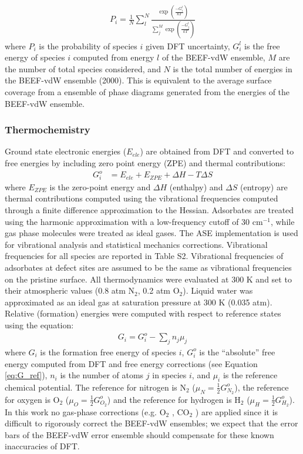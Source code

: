 \documentclass[journal=ascecg,manuscript=article,articletitle=true]{achemso}
\begin{document}
\begin{align}
	P_i = \frac{1}{N}\sum_{l} ^{N} \frac{\exp(\frac{-G_i^l}{kT})}{\sum_{j} ^{M}\exp(\frac{-G^l_j}{kT})}
	\label{eq:prob}
\end{align}
where $P_i$ is the probability of species $i$ given DFT uncertainty, $G_i^l$ is the free energy of species $i$ computed from energy $l$ of the BEEF-vdW ensemble, $M$ are the number of total species considered, and $N$ is the total number of energies in the BEEF-vdW ensemble (2000). This is equivalent to the average surface coverage from a ensemble of phase diagrams generated from the energies of the BEEF-vdW ensemble. 

\subsubsection{Thermochemistry}

Ground state electronic energies ($E_{ele}$) are obtained from DFT and converted to free energies by including zero point energy (ZPE) and thermal contributions:
\begin{align}
	G_i^o &= E_{ele} + E_{ZPE} +  \Delta H - T \Delta S \label{eq:G_ref}
\end{align}
where $E_{ZPE}$ is the zero-point energy and $\Delta H$ (enthalpy) and $\Delta S$ (entropy) are thermal contributions computed using the vibrational frequencies computed through a finite difference approximation to the Hessian. Adsorbates are treated using the harmonic approximation with a low-frequency cutoff of 30 cm$^{-1}$, while gas phase molecules were treated as ideal gases. The ASE implementation \cite{ISI:000175131400009} is used for vibrational analysis and statistical mechanics corrections. Vibrational frequencies for all species are reported in Table S2. Vibrational frequencies of adsorbates at defect sites are assumed to be the same as vibrational frequencies on the pristine surface. All thermodynamics were evaluated at 300 K and set to their atmospheric values (0.8 atm N$_2$, 0.2 atm O$_2$). Liquid water was approximated as an ideal gas at saturation pressure at 300 K (0.035 atm). Relative (formation) energies were computed with respect to reference states using the equation:
\begin{align}
	G_i = G_i^o - \sum_j n_j \mu_j\label{eq:G_sum}
\end{align}
where $G_i$ is the formation free energy of species $i$, $G_i^o$ is the ``absolute'' free energy computed from DFT and free energy corrections (see Equation \ref{eq:G_ref}), $n_i$ is the number of atoms $j$ in species $i$, and $\mu_i$ is the reference chemical potential. The reference for nitrogen is N$_2$ ($\mu_N = \frac{1}{2} G_{N_2}^o$), the reference for oxygen is O$_2$ ($\mu_O = \frac{1}{2} G_{O_2}^o$) and the reference for hydrogen is H$_2$ ($\mu_H = \frac{1}{2} G_{H_2}^o$). In this work no gas-phase corrections (e.g. O$_2$ \cite{Norskov_2004}, CO$_2$ \cite{Peterson_2010}) are applied since it is difficult to rigorously correct the BEEF-vdW ensembles; we expect that the error bars of the BEEF-vdW error ensemble should compensate for these known inaccuracies of DFT.
\end{document}
